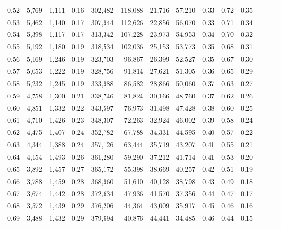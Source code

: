\begin{tabular}{rrrrrrrrrrrrrr}
0.52 &   5,769 &  1,111 &  0.16 &  302,482 &  118,088 &  21,716 &  57,210 &  0.33 &  0.72 &      0.35 \\
0.53 &   5,462 &  1,140 &  0.17 &  307,944 &  112,626 &  22,856 &  56,070 &  0.33 &  0.71 &      0.34 \\
0.54 &   5,398 &  1,117 &  0.17 &  313,342 &  107,228 &  23,973 &  54,953 &  0.34 &  0.70 &      0.32 \\
0.55 &   5,192 &  1,180 &  0.19 &  318,534 &  102,036 &  25,153 &  53,773 &  0.35 &  0.68 &      0.31 \\
0.56 &   5,169 &  1,246 &  0.19 &  323,703 &   96,867 &  26,399 &  52,527 &  0.35 &  0.67 &      0.30 \\
0.57 &   5,053 &  1,222 &  0.19 &  328,756 &   91,814 &  27,621 &  51,305 &  0.36 &  0.65 &      0.29 \\
0.58 &   5,232 &  1,245 &  0.19 &  333,988 &   86,582 &  28,866 &  50,060 &  0.37 &  0.63 &      0.27 \\
0.59 &   4,758 &  1,300 &  0.21 &  338,746 &   81,824 &  30,166 &  48,760 &  0.37 &  0.62 &      0.26 \\
0.60 &   4,851 &  1,332 &  0.22 &  343,597 &   76,973 &  31,498 &  47,428 &  0.38 &  0.60 &      0.25 \\
0.61 &   4,710 &  1,426 &  0.23 &  348,307 &   72,263 &  32,924 &  46,002 &  0.39 &  0.58 &      0.24 \\
0.62 &   4,475 &  1,407 &  0.24 &  352,782 &   67,788 &  34,331 &  44,595 &  0.40 &  0.57 &      0.22 \\
0.63 &   4,344 &  1,388 &  0.24 &  357,126 &   63,444 &  35,719 &  43,207 &  0.41 &  0.55 &      0.21 \\
0.64 &   4,154 &  1,493 &  0.26 &  361,280 &   59,290 &  37,212 &  41,714 &  0.41 &  0.53 &      0.20 \\
0.65 &   3,892 &  1,457 &  0.27 &  365,172 &   55,398 &  38,669 &  40,257 &  0.42 &  0.51 &      0.19 \\
0.66 &   3,788 &  1,459 &  0.28 &  368,960 &   51,610 &  40,128 &  38,798 &  0.43 &  0.49 &      0.18 \\
0.67 &   3,674 &  1,442 &  0.28 &  372,634 &   47,936 &  41,570 &  37,356 &  0.44 &  0.47 &      0.17 \\
0.68 &   3,572 &  1,439 &  0.29 &  376,206 &   44,364 &  43,009 &  35,917 &  0.45 &  0.46 &      0.16 \\
0.69 &   3,488 &  1,432 &  0.29 &  379,694 &   40,876 &  44,441 &  34,485 &  0.46 &  0.44 &      0.15 \\

\end{tabular}
